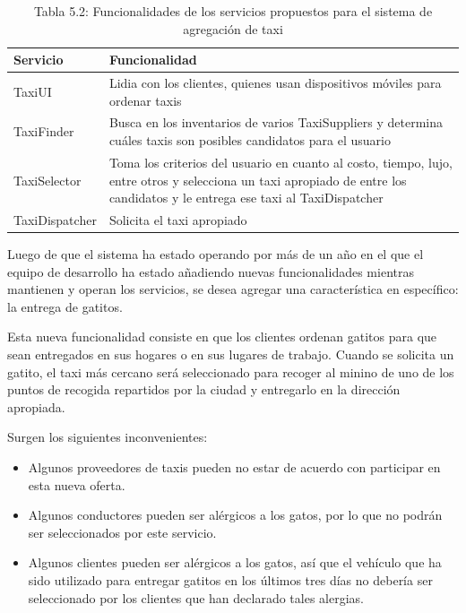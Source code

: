 \documentclass[12pt, a4paper]{article}
\begin{document}
        \begin{table}[H]
            \centering
            \begin{tabular}{|l|p{10cm}|}
                \toprule
                Servicio&Funcionalidad\\
                \midrule
                TaxiUI&Lidia con los clientes, quienes usan dispositivos móviles para ordenar taxis\\
                TaxiFinder&Busca en los inventarios de varios TaxiSuppliers y determina cuáles taxis son posibles candidatos para el usuario\\
                TaxiSelector& Toma los criterios del usuario en cuanto al costo, tiempo, lujo, entre otros y selecciona un taxi apropiado de entre los candidatos y le entrega ese taxi al TaxiDispatcher\\
                TaxiDispatcher&Solicita el taxi apropiado\\
                \bottomrule
            \end{tabular}
            \caption*{Tabla 5.2: Funcionalidades de los servicios propuestos para el sistema de agregación de taxi}
            \label{tab:Tabla5.2}
        \end{table}

        Luego de que el sistema ha estado operando por más de un año en el que el equipo de desarrollo ha estado añadiendo nuevas funcionalidades mientras mantienen y operan los servicios, se desea agregar una característica en específico: la entrega de gatitos.

        Esta nueva funcionalidad consiste en que los clientes ordenan gatitos para que sean entregados en sus hogares o en sus lugares de trabajo. Cuando se solicita un gatito, el taxi más cercano será seleccionado para recoger al minino de uno de los puntos de recogida repartidos por la ciudad y entregarlo en la dirección apropiada.

        Surgen los siguientes inconvenientes:

        \begin{itemize}
            \item Algunos proveedores de taxis pueden no estar de acuerdo con participar en esta nueva oferta.
            \item Algunos conductores pueden ser alérgicos a los gatos, por lo que no podrán ser seleccionados por este servicio.
            \item Algunos clientes pueden ser alérgicos a los gatos, así que el vehículo que ha sido utilizado para entregar gatitos en los últimos tres días no debería ser seleccionado por los clientes que han declarado tales alergias.
        \end{itemize}
\end{document}

